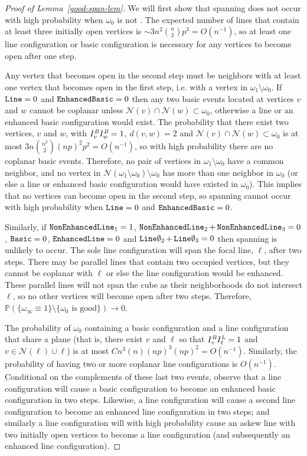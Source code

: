 \documentclass{amsart}
\newcommand{\vect}[1]{{ #1}}
\newcommand{\prob}{\mathbb{P}}
\newcommand{\B}{I^{\text{\em B}}}
\newcommand{\Lfoo}{I^{\text{\em L}}}
\newcommand{\basic}{\operatorname{\tt Basic}}
\newcommand{\lin}{\operatorname{\tt Line}}
\newcommand{\oline}{\operatorname{\tt  Line\emptyset}}
\newcommand{\eline}{\operatorname{\tt Enhanced Line}}
\newcommand{\ebasic}{\operatorname{\tt Enhanced Basic}}
\newcommand{\neline}{\operatorname{\tt NonEnhancedLine}}
\newcommand{\good}{\text{good}}
\numberwithin{equation}{section}
\newcommand{\Ln}{\ell}
\theoremstyle{definition}
\theoremstyle{remark}
\begin{document}
\begin{proof}[Proof of Lemma~\ref{good-span-lem}]
We will first show that spanning does not occur with high probability when $\omega_0$ is not \good.  The expected number of lines that contain at least three initially open vertices is $\sim3n^2  {n \choose 3}p^3=O(n^{-1})$, so at least one line configuration or basic configuration is necessary for any vertices to become open after one step.  

Any vertex that becomes open in the second step must be neighbors with at least one vertex that becomes open in the first step, i.e. with a vertex in $\omega_1\setminus \omega_0$.  If $\lin = 0$ and $\ebasic=0$ then any two basic events located at vertices $\vect{v}$ and $\vect{w}$ cannot be coplanar unless $\mathcal{N}(\vect{v})\cap \mathcal{N}(\vect{w}) \subset \omega_0$, otherwise a line or an enhanced basic configuration would exist.  The probability that there exist two vertices, $\vect{v}$ and $\vect{w}$, with $\B_{\vect{v}}\B_{\vect{w}} = 1$, $d(\vect{v},\vect{w})=2$ and $\mathcal{N}(\vect{v})\cap \mathcal{N}(\vect{w}) \subset \omega_0$ is at most $3n {n^2 \choose 2} (np)^2 p^2 = O(n^{-1})$, so with high probability there are no coplanar basic events.  Therefore, no pair of vertices in $\omega_1 \setminus \omega_0$ have a common neighbor, and no vertex in $\mathcal{N}(\omega_1 \setminus \omega_0) \setminus \omega_0$ has more than one neighbor in $\omega_0$ (or else a line or enhanced basic configuration would have existed in $\omega_0$).  This implies that no vertices can become open in the second step, so spanning cannot occur with high probability when $\lin = 0$ and $\ebasic = 0$.

Similarly, if $\neline_1 = 1$, $\neline_2+\neline_3=0$, $\basic = 0$, \newline $\eline = 0$ and $\oline_2 + \oline_3 = 0$ then spanning is unlikely to occur.  The sole line configuration will span the focal line, $\Ln$, after two steps.  There may be parallel lines that contain two occupied vertices, but they cannot be coplanar with $\Ln$ or else the line configuration would be enhanced.  These parallel lines will not span the cube as their neighborhoods do not intersect $\Ln$, so no other vertices will become open after two steps.  Therefore,  $\prob(\{\omega_\infty \equiv 1\} \setminus \{\omega_0 \text{ is } \good\}) \to 0$.

The probability of $\omega_0$ containing a basic configuration and a line configuration that share a plane (that is, there exist $\vect{v}$ and $\Ln$ so that $\B_{\vect{v}} \Lfoo_\Ln=1$ and $\vect{v} \in \mathcal{N}(\Ln)\cup \Ln$) is at most $Cn^3 (n) (np)^3  (np)^2 = O(n^{-1})$.  Similarly, the probability of having two or more coplanar line configurations is $O(n^{-1})$.  Conditional on the complements of these last two events, observe that a line configuration will cause a basic configuration to become an enhanced basic configuration in two steps.  Likewise, a line configuration will cause a second line configuration to become an enhanced line configuration in two steps; and similarly a line configuration will with high probability cause an askew line with two initially open vertices to become a line configuration (and subsequently an enhanced line configuration).


\end{proof}
\end{document}
